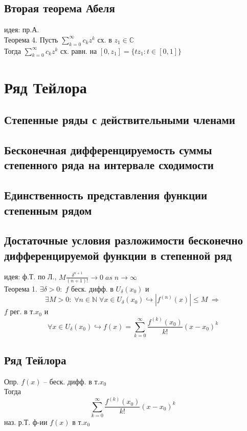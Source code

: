 \documentclass{article}
\begin{document}
\subsection{Вторая теорема Абеля}
идея: пр.А. \\
Теорема 4. Пусть $\sum_{k=0}^\infty c_k z^k$ сх. в $z_1 \in \mathbb C$ \\
Тогда $\sum_{k=0}^\infty c_k z^k$ сх. равн. на $[0, z_1] = \{ tz_1: t \in [0,1] \}$
\section{Ряд Тейлора}
\subsection{Степенные ряды с действительными членами}
\subsection{Бесконечная дифференцируемость суммы степенного ряда на интервале сходимости}
\subsection{Единственность представления функции степенным рядом}
\subsection{Достаточные условия разложимости бесконечно дифференцируемой функции в степенной ряд}
идея: ф.Т. по Л., $M \frac{\delta^{n+1}}{(n+1)!} \rightarrow 0 \; as \; n \rightarrow \infty$ \\
Теорема 1. $\exists \delta > 0: \; f$ беск. дифф. в $U_\delta (x_0)$ и 
\begin{equation*}
    \exists M > 0: \; \forall n \in \mathbb N \; \forall x \in U_\delta (x_0) \hookrightarrow |f^{(n)}(x)| \leq M \; \Rightarrow
\end{equation*}
$f$ рег. в т.$x_0$ и
\begin{equation*}
    \forall x \in U_\delta (x_0) \hookrightarrow f(x) = \sum_{k=0}^\infty \frac{f^{(k)} (x_0)}{k!} (x-x_0)^k
\end{equation*}
\subsection{Ряд Тейлора}
Опр. $f(x)$ -- беск. дифф. в т.$x_0$ \\
Тогда
\begin{equation*}
    \sum_{k=0}^\infty \frac{f^{(k)} (x_0)}{k!} (x-x_0)^k
\end{equation*}
наз. р.Т. ф-ии $f(x)$ в т.$x_0$
\end{document}
